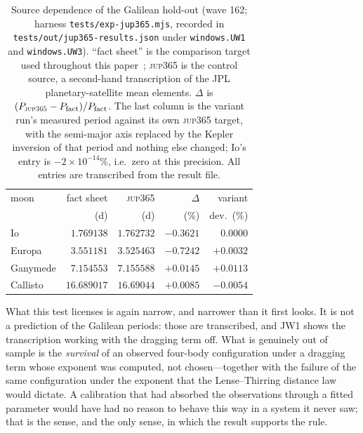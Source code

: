 \documentclass[aps,reprint,amsmath,amssymb,nofootinbib,superscriptaddress,floatfix]{revtex4-2}
\begin{document}
\begin{table}[t]
\caption{Source dependence of the Galilean hold-out (wave 162; harness
  \texttt{tests/exp-jup365.mjs}, recorded in
  \texttt{tests/out/jup365-results.json} under \texttt{windows.UW1} and
  \texttt{windows.UW3}). ``fact sheet'' is the comparison target used
  throughout this paper~\cite{NASASats}; \textsc{jup365} is the control
  source, a second-hand transcription of the JPL planetary-satellite
  mean elements. $\Delta$ is
  $(P_{\textsc{jup365}}-P_{\mathrm{fact}})/P_{\mathrm{fact}}$. The last
  column is the variant run's measured period against its own
  \textsc{jup365} target, with the semi-major axis replaced by the
  Kepler inversion of that period and nothing else changed; Io's entry
  is $-2\times10^{-14}\%$, i.e.\ zero at this precision. All entries
  are transcribed from the result file.}
\label{tab:jup365}
\begin{ruledtabular}
\begin{tabular}{lrrrr}
moon & fact sheet & \textsc{jup365} & $\Delta$ & variant \\
 & (d) & (d) & (\%) & dev.\ (\%) \\
\colrule
Io       & $1.769138$  & $1.762732$ & $-0.3621$ & $0.0000$ \\
Europa   & $3.551181$  & $3.525463$ & $-0.7242$ & $+0.0032$ \\
Ganymede & $7.154553$  & $7.155588$ & $+0.0145$ & $+0.0113$ \\
Callisto & $16.689017$ & $16.69044$ & $+0.0085$ & $-0.0054$ \\
\end{tabular}
\end{ruledtabular}
\end{table}

What this test licenses is again narrow, and narrower than it first
looks.
It is not a prediction of the Galilean periods: those are transcribed,
and JW1 shows the transcription working with the dragging term off.
What is genuinely out of sample is the \emph{survival} of an observed
four-body configuration under a dragging term whose exponent was
computed, not chosen---together with the failure of the same
configuration under the exponent that the Lense--Thirring distance law
would dictate.
A calibration that had absorbed the observations through a fitted
parameter would have had no reason to behave this way in a system it
never saw; that is the sense, and the only sense, in which the result
supports the rule.
\end{document}

